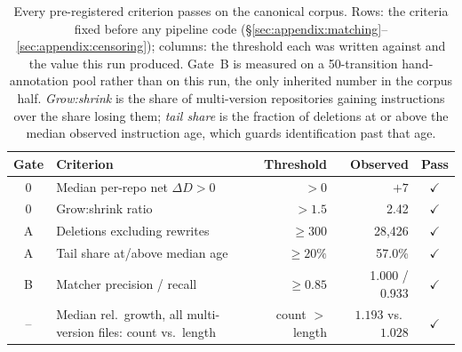 \begin{table}[t]
  \centering\small
  \begin{tabularx}{\textwidth}{@{}c>{\raggedright\arraybackslash}Xrrc@{}}
    \toprule
    Gate & Criterion & Threshold & Observed & Pass \\
    \midrule
    0 & Median per-repo net $\Delta D > 0$ & $> 0$ & $+7$ & $\checkmark$ \\
    0 & Grow:shrink ratio & $> 1.5$ & 2.42 & $\checkmark$ \\
    A & Deletions excluding rewrites & $\ge 300$ & 28,426 & $\checkmark$ \\
    A & Tail share at/above median age & $\ge 20\%$ & 57.0\% & $\checkmark$ \\
    B & Matcher precision / recall & $\ge 0.85$ & 1.000 / 0.933 & $\checkmark$ \\
    -- & Median rel.\ growth, all multi-version files: count vs.\ length & count $>$ length & $1.193$ vs.\ $1.028$ & $\checkmark$ \\
    \bottomrule
  \end{tabularx}
  \caption{
    Every pre-registered criterion passes on the canonical corpus. Rows: the criteria fixed before
    any pipeline code (\S\ref{sec:appendix:matching}--\ref{sec:appendix:censoring}); columns: the
    threshold each was written against and the value this run produced. Gate~B is measured on a
    50-transition hand-annotation pool rather than on this run, the only inherited number in the
    corpus half. \emph{Grow:shrink} is the share of multi-version repositories gaining instructions
    over the share losing them; \emph{tail share} is the fraction of deletions at or above the
    median observed instruction age, which guards identification past that age.
  }
  \label{tab:gates}
\end{table}
